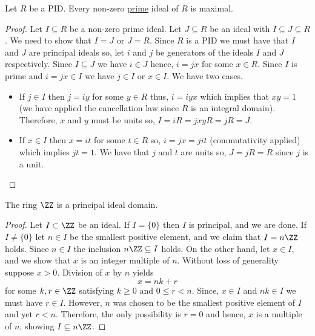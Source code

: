 \documentclass[12pt, a4paper]{article}
\begin{document}
\begin{mdprop}
    Let \(R\) be a PID. Every non-zero \underline{prime} ideal of \(R\) is maximal.
\end{mdprop}

\begin{proof}
    Let \(I \subseteq R\) be a non-zero prime ideal. Let \(J \subseteq R\) be an ideal with \(I \subseteq J \subseteq R\). We need to show that \(I =J\) or \(J=R\). Since \(R\) is a PID we must have that \(I\) and \(J\) are principal ideals so, let \(i\) and \(j\) be generators of the ideals \(I\) and \(J\) respectively. Since \(I \subseteq J\) we have \(i \in J\) hence, \(i=jx\) for some \(x \in R\). Since \(I\) is prime and \(i=jx \in I\) we have \(j \in I\) or \(x \in I\). We have two cases.
    \begin{itemize}
        \item If \(j \in I\) then \(j = iy\) for some \(y \in R\) thus, \(i=iyx\) which implies that \(xy=1\) (we have applied the cancellation law since \(R\) is an integral domain). Therefore, \(x\) and \(y\) must be units so, \(I=iR=jxyR=jR=J\).
        \item If \(x \in I\) then \(x=it\) for some \(t \in R\) so, \(i=jx=jit\) (commutativity applied) which implies \(jt=1\). We have that \(j\) and \(t\) are units so, \(J = jR=R\) since \(j\) is a unit.
    \end{itemize}
\end{proof}

\begin{theorem}
    The ring \(\ZZ\) is a principal ideal domain.
\end{theorem}

\begin{proof}
    Let \(I \subset \ZZ\) be an ideal. If \(I =\{0\}\) then \(I\) is principal, and we are done. If \(I \neq \{0\}\) let \(n \in I\) be the smallest positive element, and we claim that \(I = n\ZZ\) holds. Since \(n \in I\) the inclusion \(n\ZZ \subseteq I\) holds. On the other hand, let \(x \in I\), and we show that \(x\) is an integer multiple of \(n\). Without loss of generality suppose \(x >0\). Division of \(x\) by \(n\) yields
    \[x = nk+r\]
    for some \(k,r \in \ZZ\) satisfying \(k \geq 0\) and \(0 \leq r < n\). Since, \(x \in I\) and \(nk \in I\) we must have \(r \in I\). However, \(n\) was chosen to be the smallest positive element of \(I\) and yet \(r<n\). Therefore, the only possibility is \(r=0\) and hence, \(x\) is a multiple of \(n\), showing \(I \subseteq n\ZZ\).
\end{proof}
\end{document}
